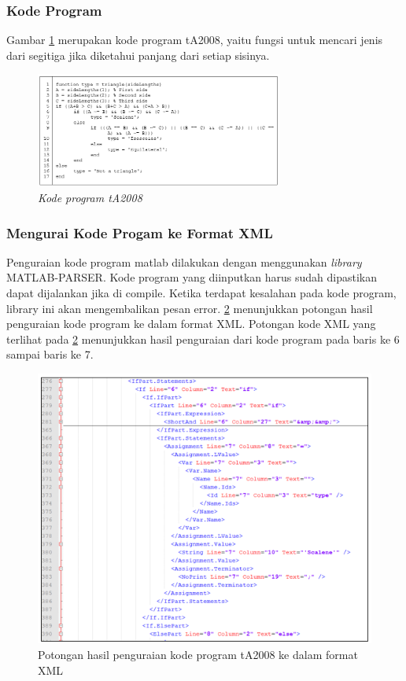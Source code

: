 \subsubsection*{Kode Program}
Gambar \ref{fig:tA2008} merupakan kode program tA2008, yaitu fungsi untuk mencari jenis dari segitiga jika diketahui panjang dari setiap sisinya.
\begin{figure}[h!]
	\centering
	\includegraphics[width=230pt]{gambar/tA2008}
	\caption{\textit{Kode program tA2008}}
	\label{fig:tA2008}
\end{figure}

\subsubsection*{Mengurai Kode Progam ke Format XML}
Penguraian kode program matlab dilakukan dengan menggunakan \textit{library}  MATLAB-PARSER. Kode program yang diinputkan harus sudah dipastikan dapat dijalankan jika di compile. Ketika terdapat kesalahan pada kode program, library  ini akan mengembalikan pesan error. \ref{fig:xml-ta2008} menunjukkan potongan hasil penguraian kode program ke dalam format XML. Potongan kode XML yang terlihat pada \ref{fig:xml-ta2008} menunjukkan hasil penguraian dari kode program pada baris ke 6 sampai baris ke 7.

\begin{figure}
	\centering
	\includegraphics[width=0.9\linewidth]{"gambar/XML tA2008"}
	\caption{Potongan hasil penguraian kode program tA2008 ke dalam format XML}
	\label{fig:xml-ta2008}
\end{figure}

